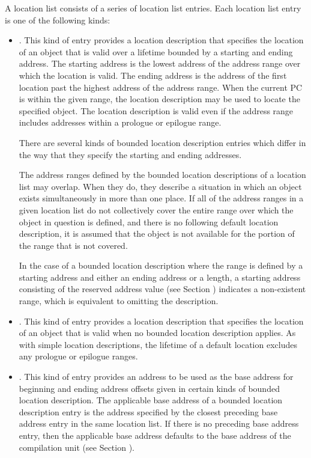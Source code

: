 A location list consists of a series of location list entries.
Each location list entry is one of the following kinds:
\begin{itemize}
\item {}.
\label{text:bndlocdesc}
\bbeb
This kind of entry provides a
location description that specifies the location of
an object that is valid over a lifetime bounded
by a starting and ending address. The starting address is the
lowest address of the address range over which the location
is valid. The ending address is the address of the first
location past the highest address of the address range.
When the current PC is within the given range, the location
description may be used to locate the specified object.
\bb
The location description is valid even if the address range
includes addresses within a prologue or epilogue range.
\eb

There are several kinds of bounded location description
entries which differ in the way that they specify the
starting and ending addresses.

The address ranges defined by the bounded location descriptions
of a location list may overlap. When they do, they describe a
situation in which an object exists simultaneously in more than
one place. If all of the address ranges in a given location
list do not collectively cover the entire range over which the
object in question is defined, and there is no following default
location description, it is assumed that the object is not
available for the portion of the range that is not covered.

\bb
{}
In the case of a bounded location description where the range is defined
by a starting address and either an ending address or a length, a
starting address consisting of the reserved address value (see Section
) indicates a non-existent range,
which is equivalent to omitting the description.
\eb

\item {}.
This kind of entry provides a
location description that specifies the location of
an object that is valid when no bounded location description
applies.
\bb
As with simple location descriptions, the lifetime of a default
location excludes any prologue or epilogue ranges.
\eb

\item {}.
This kind of entry provides an address to be
used as the base address for beginning and ending address
offsets given in certain kinds of bounded location description.
The applicable base address of a bounded location description
entry is the address specified by the closest preceding base
address entry in the same location list. If there is no
preceding base address entry, then the applicable base address
defaults to the base address of the compilation unit (see
Section ).


\end{itemize}
